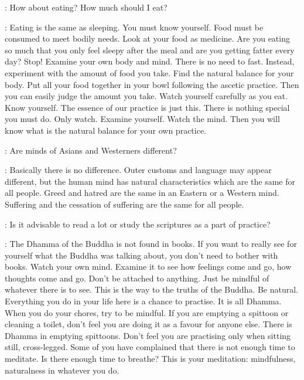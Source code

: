 :
How about eating? How much should I eat? 

: Eating is the same as sleeping. You must know yourself. Food must be consumed to meet bodily needs. Look at your food as medicine. Are you eating so much that you only feel sleepy after the meal and are you getting fatter every day? Stop! Examine your own body and mind. There is no need to fast. Instead, experiment with the amount of food you take. Find the natural balance for your body. Put all your food together in your bowl following the ascetic practice. Then you can easily judge the amount you take. Watch yourself carefully as you eat. Know yourself. The essence of our practice is just this. There is nothing special you must do. Only watch. Examine yourself. Watch the mind. Then you will know what is the natural balance for your own practice. 

:
Are minds of Asians and Westerners different? 

: Basically there is no difference. Outer customs and language may appear different, but the human mind has natural characteristics which are the same for all people. Greed and hatred are the same in an Eastern or a Western mind. Suffering and the cessation of suffering are the same for all people. 

:
Is it advisable to read a lot or study the scriptures as a part of practice? 

: The Dhamma of the Buddha is not found in books. If you want to really see for yourself what the Buddha was talking about, you don't need to bother with books. Watch your own mind. Examine it to see how feelings come and go, how thoughts come and go. Don't be attached to anything. Just be mindful of whatever there is to see. This is the way to the truths of the Buddha. Be natural. Everything you do in your life here is a chance to practise. It is all Dhamma. When you do your chores, try to be mindful. If you are emptying a spittoon or cleaning a toilet, don't feel you are doing it as a favour for anyone else. There is Dhamma in emptying spittoons. Don't feel you are practising only when sitting still, cross-legged. Some of you have complained that there is not enough time to meditate. Is there enough time to breathe? This is your meditation: mindfulness, naturalness in whatever you do. 


